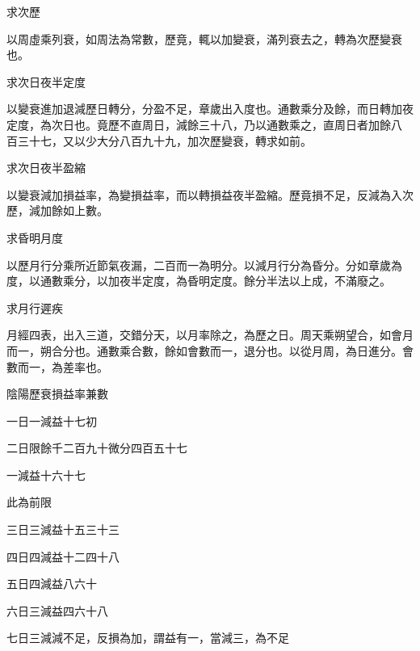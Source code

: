 \begin{pinyinscope}
 求次歷



 以周虛乘列衰，如周法為常數，歷竟，輒以加變衰，滿列衰去之，轉為次歷變衰也。



 求次日夜半定度



 以變衰進加退減歷日轉分，分盈不足，章歲出入度也。通數乘分及餘，而日轉加夜定度，為次日也。竟歷不直周日，減餘三十八，乃以通數乘之，直周日者加餘八
 百三十七，又以少大分八百九十九，加次歷變衰，轉求如前。



 求次日夜半盈縮



 以變衰減加損益率，為變損益率，而以轉損益夜半盈縮。歷竟損不足，反減為入次歷，減加餘如上數。



 求昏明月度



 以歷月行分乘所近節氣夜漏，二百而一為明分。以減月行分為昏分。分如章歲為度，以通數乘分，以加夜半定度，為昏明定度。餘分半法以上成，不滿廢之。



 求月行遲疾



 月經四表，出入三道，交錯分天，以月率除之，為歷之日。周天乘朔望合，如會月而一，朔合分也。通數乘合數，餘如會數而一，退分也。以從月周，為日進分。會數而一，為差率也。



 陰陽歷衰損益率兼數



 一日一減益十七初



 二日限餘千二百九十微分四百五十七



 一減益十六十七



 此為前限



 三日三減益十五三十三



 四日四減益十二四十八



 五日四減益八六十



 六日三減益四六十八



 七日三減減不足，反損為加，謂益有一，當減三，為不足




\end{pinyinscope}

